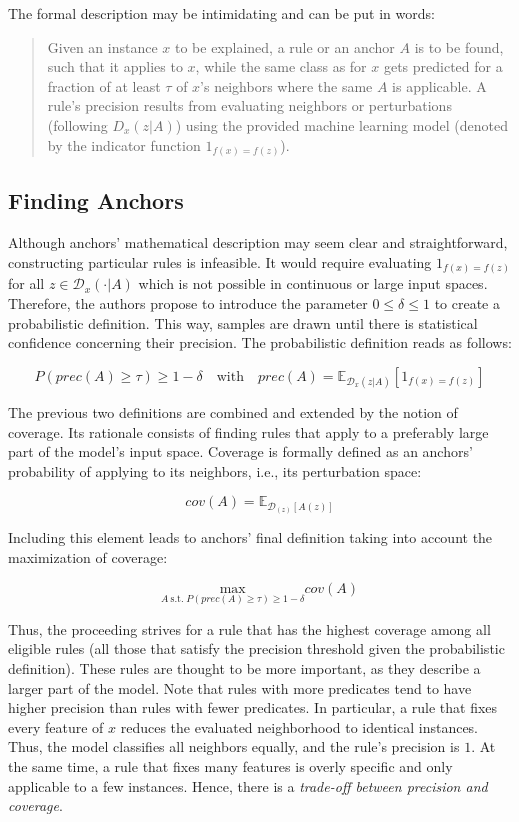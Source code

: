 \documentclass[12pt,]{krantz}
\begin{document}
The formal description may be intimidating and can be put in words:

\begin{quote}
Given an instance \(x\) to be explained, a rule or an anchor \(A\) is to
be found, such that it applies to \(x\), while the same class as for
\(x\) gets predicted for a fraction of at least \(\tau\) of \(x\)'s
neighbors where the same \(A\) is applicable. A rule's precision results
from evaluating neighbors or perturbations (following \(D_x (z|A)\))
using the provided machine learning model (denoted by the indicator
function \(1_{f(x) = f(z)}\)).
\end{quote}

\subsection{Finding Anchors}\label{finding-anchors}

Although anchors' mathematical description may seem clear and
straightforward, constructing particular rules is infeasible. It would
require evaluating \(1_{f(x) = f(z)}\) for all
\(z \in \mathcal{D}_x(\cdot|A)\) which is not possible in continuous or
large input spaces. Therefore, the authors propose to introduce the
parameter \(0 \leq \delta \leq 1\) to create a probabilistic definition.
This way, samples are drawn until there is statistical confidence
concerning their precision. The probabilistic definition reads as
follows:

\[P(prec(A)\geq\tau)\geq{}1-\delta\quad\textrm{with}\quad{}prec(A)=\mathbb{E}_{\mathcal{D}_x(z|A)}[1_{f(x)=f(z)}]\]

The previous two definitions are combined and extended by the notion of
coverage. Its rationale consists of finding rules that apply to a
preferably large part of the model's input space. Coverage is formally
defined as an anchors' probability of applying to its neighbors, i.e.,
its perturbation space:

\[cov(A)=\mathbb{E}_{\mathcal{D}_{(z)}[A(z)]}\]

Including this element leads to anchors' final definition taking into
account the maximization of coverage:

\[\underset{A\:\textrm{s.t.}\;P(prec(A)\geq\tau)\geq{}1-\delta}{\textrm{max}}cov(A)\]

Thus, the proceeding strives for a rule that has the highest coverage
among all eligible rules (all those that satisfy the precision threshold
given the probabilistic definition). These rules are thought to be more
important, as they describe a larger part of the model. Note that rules
with more predicates tend to have higher precision than rules with fewer
predicates. In particular, a rule that fixes every feature of \(x\)
reduces the evaluated neighborhood to identical instances. Thus, the
model classifies all neighbors equally, and the rule's precision is
\(1\). At the same time, a rule that fixes many features is overly
specific and only applicable to a few instances. Hence, there is a
\emph{trade-off between precision and coverage}.
\end{document}
